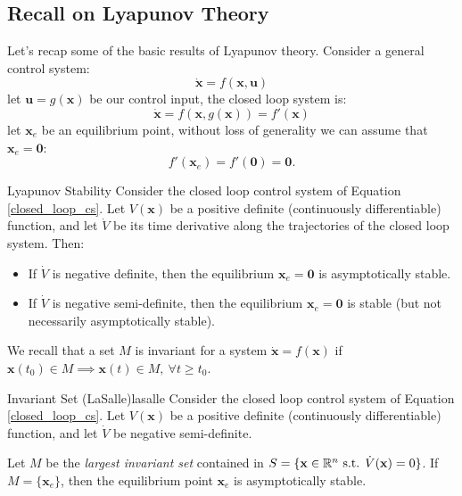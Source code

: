 \documentclass[10pt, a4paper]{report}
\begin{document}
\subsection{Recall on Lyapunov Theory}
Let's recap some of the basic results of Lyapunov theory. Consider a general control system:\begin{equation}
    \dot{\mathbf x}=f(\mathbf x,\mathbf u)
\end{equation}
let $\mathbf u=g(\mathbf x)$ be our control input, the closed loop system is:\begin{equation}\label{closed_loop_cs}
    \dot{\mathbf x}=f(\mathbf x,g(\mathbf x))=f'(\mathbf x)
\end{equation}
let $\mathbf x_e$ be an equilibrium point, without loss of generality we can assume that $\mathbf x_e=\mathbf 0$:\begin{equation}
    f'(\mathbf x_e)=f'(\mathbf 0)=\mathbf 0.
\end{equation}
\begin{boxtheorem}{Lyapunov Stability}{}
    Consider the closed loop control system of Equation \eqref{closed_loop_cs}. Let $V(\mathbf x)$ be a positive definite (continuously differentiable) function, and let $\dot V$ be its time derivative along the trajectories of the closed loop system. Then:\begin{itemize}
        \item If $\dot V$ is negative definite, then the equilibrium $\mathbf x_e=\mathbf 0$ is asymptotically stable.
        \item If $\dot V$ is negative semi-definite, then the equilibrium $\mathbf x_e=\mathbf 0$ is stable (but not necessarily asymptotically stable).
    \end{itemize}
\end{boxtheorem}
\noindent We recall that a set $M$ is invariant for a system $\dot{\mathbf x}=f(\mathbf x)$ if $\mathbf x(t_0)\in M \implies \mathbf x(t)\in M, \ \forall t\ge t_0$.
\begin{boxtheorem}{Invariant Set (LaSalle)}{lasalle}
    Consider the closed loop control system of Equation \eqref{closed_loop_cs}. Let $V(\mathbf x)$ be a positive definite (continuously differentiable) function, and let $\dot V$ be negative semi-definite. 

    Let $M$ be the \textit{largest invariant set} contained in $S=\{\mathbf x\in{\mathbb R}^n \text{ s.t. }\dot V(\mathbf x)=0\}$. If $M=\{\mathbf x_e\}$, then the equilibrium point $\mathbf x_e$ is asymptotically stable.
\end{boxtheorem}
\end{document}
